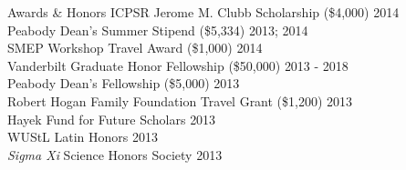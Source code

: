 \documentclass {resume}
\begin{document}
\begin{rSection}{\textrm{Awards \& Honors}}
ICPSR Jerome M. Clubb Scholarship (\$4,000) \hfill{2014}\smallskip\\
Peabody Dean's Summer Stipend (\$5,334)			    \hfill  {2013; 2014}\smallskip\\	
SMEP Workshop Travel Award (\$1,000) \hfill{2014}\smallskip\\
Vanderbilt Graduate Honor Fellowship (\$50,000)	\hfill  {2013 - 2018}\smallskip\\	
Peabody Dean's Fellowship (\$5,000)					\hfill  {2013}\smallskip\\
Robert Hogan Family Foundation Travel Grant (\$1,200) 	\hfill  {2013}\smallskip\\
Hayek Fund for Future Scholars                      \hfill  {2013}\smallskip\\
WUStL Latin Honors \hfill  {2013}\smallskip\\
\textit{Sigma Xi} Science Honors Society                    			\hfill  {2013}%
\end{rSection}
\end{document}
